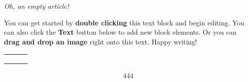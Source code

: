 \textit{Oh, an empty article!}

You can get started by \textbf{double clicking} this text block and begin editing. You can also click the \textbf{Text} button below to add new block elements. Or you can \textbf{drag and drop an image} right onto this text. Happy writing!
\begin{table} 
    \begin{tabular}{ c c c }
         &  &  \\ 
         &  &  \\ 
         &  &  \\ 
    \end{tabular} 
\end{table}

\begin{align}
444
\end{align}